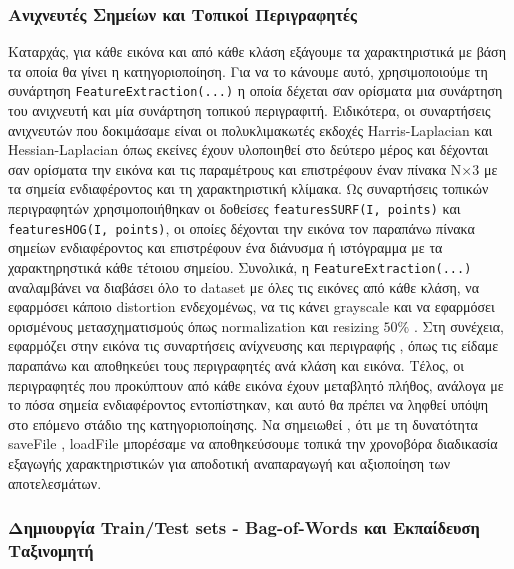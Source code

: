 \documentclass[12pt, a4paper]{article}
\begin{document}
\subsubsection{Ανιχνευτές Σημείων και Τοπικοί Περιγραφητές}

Καταρχάς, για κάθε εικόνα και από κάθε κλάση  εξάγουμε τα χαρακτηριστικά
με βάση τα οποία θα γίνει η κατηγοριοποίηση. Για να το κάνουμε αυτό,
χρησιμοποιούμε τη συνάρτηση \texttt{FeatureExtraction(...)} η οποία δέχεται σαν ορίσματα μια συνάρτηση του ανιχνευτή 
και μία συνάρτηση  τοπικού περιγραφιτή. Ειδικότερα, οι συναρτήσεις ανιχνευτών που δοκιμάσαμε είναι οι πολυκλιμακωτές εκδοχές Harris-Laplacian  και Hessian-Laplacian όπως εκείνες έχουν υλοποιηθεί στο δεύτερο μέρος και δέχονται σαν ορίσματα την εικόνα και τις παραμέτρους και επιστρέφουν έναν πίνακα N×3 με τα σημεία ενδιαφέροντος και τη χαρακτηριστική κλίμακα.
Ως συναρτήσεις τοπικών περιγραφητών χρησιμοποιήθηκαν οι δοθείσες \texttt{featuresSURF(I, points)} και \texttt{featuresHOG(I, points)}, οι οποίες δέχονται την εικόνα τον παραπάνω
πίνακα σημείων ενδιαφέροντος και επιστρέφουν ένα διάνυσμα ή ιστόγραμμα με τα χαρακτηρηστικά κάθε τέτοιου σημείου. Συνολικά, η \texttt{FeatureExtraction(...)} αναλαμβάνει να διαβάσει όλο το dataset με όλες τις εικόνες από κάθε κλάση, να εφαρμόσει κάποιο distortion ενδεχομένως, να τις κάνει grayscale  και να εφαρμόσει ορισμένους μετασχηματισμούς όπως normalization
και  resizing  $50\%$ . Στη συνέχεια, εφαρμόζει στην εικόνα τις συναρτήσεις ανίχνευσης και περιγραφής , όπως τις είδαμε παραπάνω και  αποθηκεύει τους περιγραφητές ανά κλάση και εικόνα.
Τέλος, οι περιγραφητές που προκύπτουν από κάθε εικόνα έχουν μεταβλητό πλήθος, ανάλογα με το πόσα σημεία ενδιαφέροντος εντοπίστηκαν, και αυτό θα πρέπει να ληφθεί υπόψη στο επόμενο στάδιο της κατηγοριοποίησης.
Να σημειωθεί , ότι με τη δυνατότητα saveFile , loadFile μπορέσαμε να αποθηκεύσουμε τοπικά την χρονοβόρα διαδικασία εξαγωγής χαρακτηριστικών για αποδοτική αναπαραγωγή και αξιοποίηση των αποτελεσμάτων.



\subsubsection{Δημιουργία Train/Test sets - Bag-of-Words και Εκπαίδευση Ταξινομητή}
\end{document}
